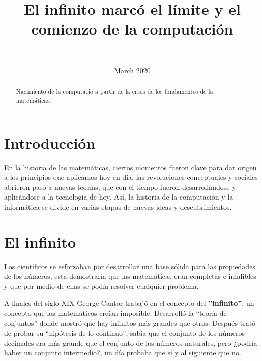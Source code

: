 ﻿\documentclass[journal,10pt,spanish]{IEEEtran}
\begin{document}
    \title{El infinito marcó el límite y el comienzo de la computación}
    \author{\\
}
\maketitle
\date{March 2020}

\maketitle
\begin{abstract}
    Nacimiento de la computació a partir de la crisis de los fundamentos de la matemáticas. \cite{sitio}
\end{abstract}


\section{Introducción}

En la historia de las matemáticas, ciertos momentos fueron clave para dar origen a los principios que aplicamos hoy en día, las revoluciones conceptuales y sociales abrieron paso a nuevas teorías, que con el tiempo fueron desarrollándose y aplicándose a la tecnología de hoy. Así, la historia de la computación y la informática se divide en varias etapas de nuevas ideas y descubrimientos.   

\section {El infinito}

Los científicos se esforzaban por desarrollar una base sólida para las propiedades de los números, esta demostraría que las matemáticas eran completas e infalibles  y que por medio de ellas se podía resolver cualquier problema. 

A finales del siglo XIX George Cantor trabajó en el concepto del \textbf{''infinito''}, un concepto que los matemáticos creían imposible. Desarrolló la “teoría de conjuntos” donde mostró que hay infinitos más grandes que otros. Después trató de probar su “hipótesis de lo continuo”, sabía que el conjunto de los números decimales era más grande que el conjunto de los números naturales, pero ¿podría haber un conjunto intermedio?, un día probaba que sí y al siguiente que no. \cite{sitio2} \cite{sitio3} 
\end{document}
